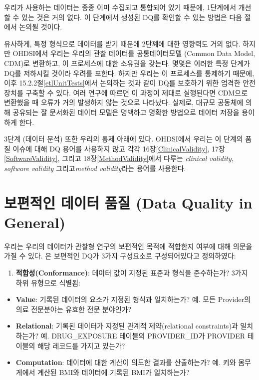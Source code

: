\documentclass[11pt]{book}
\providecommand{\tightlist}{%
  \setlength{\itemsep}{0pt}\setlength{\parskip}{0pt}}
\theoremstyle{definition}
\theoremstyle{definition}
\theoremstyle{definition}
\theoremstyle{remark}
\begin{document}
우리가 사용하는 데이터는 종종 이미 수집되고 통합되어 있기 때문에,
1단계에서 개선할 수 있는 것은 거의 없다. 이 단계에서 생성된 DQ를 확인할
수 있는 방법은 다음 절에서 논의될 것이다.

유사하게, 특정 형식으로 데이터를 받기 때문에 2단꼐에 대한 영향력도 거의
없다. 하지만 OHDSI에서 우리는 우리의 관찰 데이터를 공통데이터모델
(Common Data Model, CDM)로 변환하고, 이 프로세스에 대한 소유권을 갖는다.
몇몇은 이러한 특정 단계가 DQ를 저하시킬 것이라 우려를 표한다. 하지만
우리는 이 프로세스를 통제하기 때문에, 이후
15.2.2절\ref{etlUnitTests}에서 논의하는 것과 같이 DQ를 보호하기 위한
엄격한 안전장치를 구축할 수 있다. 여러
연구\citep{defalco_2013, makadia_2014, matcho_2014, voss_2015, voss_2015b, hripcsak_2018}에
따르면 이 과정이 제대로 실행된다면 CDM으로 변환했을 때 오류가 거의
발생하지 않는 것으로 나타났다. 실제로, 대규모 공동체에 의해 공유되는 잘
문서화된 데이터 모델은 명백하고 명확한 방법으로 데이터 저장을 용이하게
한다.

3단계 (데이터 분석) 또한 우리의 통제 아래에 있다. OHDSI에서 우리는 이
단계의 품질 이슈에 대해 DQ 용어를 사용하지 않고 각각
16장\ref{ClinicalValidity}, 17장\ref{SoftwareValidity}, 그리고
18장\ref{MethodValidity}에서 다루는 \emph{clinical validity},
\emph{software validity} 그리고\emph{method validity}라는 용어를
사용한다.

\section{보편적인 데이터 품질 (Data Quality in
General)}\label{---data-quality-in-general}

우리는 우리의 데이터가 관찰형 연구의 보편적인 목적에 적합한지 여부에
대해 의문을 가질 수 있다. \citet{kahn_harmonized_2016} 은 보편적인 DQ가
3가지 구성요소로 구성되어있다고 정의하였다:

\begin{enumerate}
\def\labelenumi{\arabic{enumi}.}
\tightlist
\item
  \textbf{적합성(Conformance)}: 데이터 값이 지정된 표준과 형식을
  준수하는가? 3가지 하위 유형으로 식별됨:
\end{enumerate}

\begin{itemize}
\tightlist
\item
  \textbf{Value}: 기록된 데이터의 요소가 지정된 형식과 일치하는가? 예.
  모든 Provider의 의료 전문분야는 유효한 전문 분야인가?
\item
  \textbf{Relational}: 기록된 데이터가 지정된 관계적 제약(relational
  constraints)과 일치하는가? 예. DRUG\_EXPOSURE 테이블의 PROVIDER\_ID가
  PROVIDER 테이블의 해당 레코드를 가지고 있는가?
\item
  \textbf{Computation}: 데이터에 대한 계산이 의도한 결과를 산출하는가?
  예. 키와 몸무게에서 계산된 BMI와 데이터에 기록된 BMI가 일치하는가?
\end{itemize}
\end{document}
